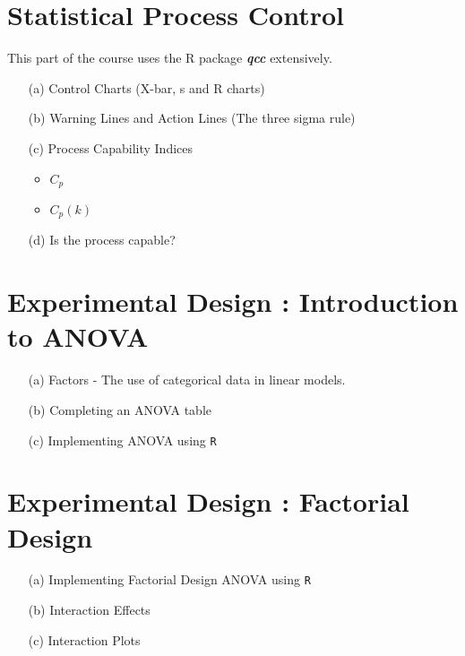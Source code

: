 \newpage

\section{Statistical Process Control}
This part of the course uses the R package \textit{\textbf{qcc}} extensively.
\begin{itemize}
\item[(a)] Control Charts (X-bar, s and R charts)
\item[(b)] Warning Lines and Action Lines (The three sigma rule)
\item[(c)] Process Capability Indices
\begin{itemize}
\item $C_p$
\item $C_p(k)$
\end{itemize}
\item[(d)] Is the process capable?
\end{itemize}



\section{Experimental Design : Introduction to ANOVA}

\begin{itemize}
\item[(a)] Factors  - The use of categorical data in linear models.
\item[(b)] Completing an ANOVA table
\item[(c)] Implementing ANOVA using \texttt{R}
\end{itemize}


\section{Experimental Design : Factorial Design}
\begin{itemize}
\item[(a)] Implementing Factorial Design ANOVA using \texttt{R}
\item[(b)] Interaction Effects
\item[(c)] Interaction Plots
\end{itemize}



